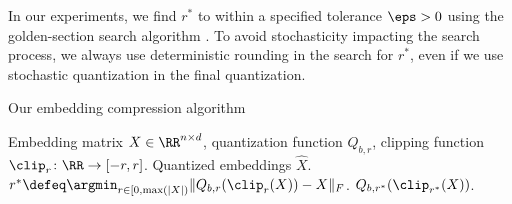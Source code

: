 In our experiments, we find $r^*$ to within a specified tolerance $\eps > 0$ using the golden-section search algorithm \citep{golden53}.
To avoid stochasticity impacting the search process, we always use deterministic rounding in the search for $r^*$, even if we use stochastic quantization in the final quantization.

\begin{algorithm}[tb]
   \caption{Our embedding compression algorithm}
   \label{alg:smallfry}
\begin{algorithmic}[1]
	  Embedding matrix $X \in \RR^{n \times d}$, quantization function $Q_{b,r}$, clipping function $\clip_r\colon\RR\rightarrow[-r,r]$.
	 Quantized embeddings $\hat{X}$.
	\STATE $r^* \defeq \argmin_{r \in [0,\max(|X|)} \|Q_{b,r}(\clip_r(X))-X\|_F$.
	 $Q_{b,r^*}(\clip_{r^*}(X))$.
\end{algorithmic}
\end{algorithm}

